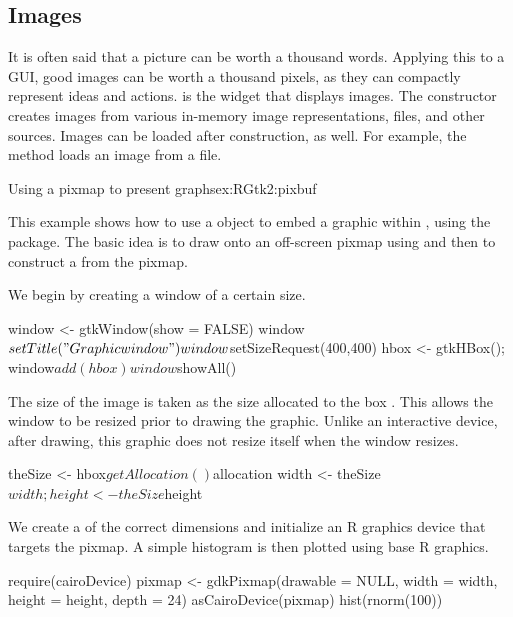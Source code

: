 \subsection{Images}
\label{sec:RGtk2:images}

It is often said that a picture can be worth a thousand
words. Applying this to a GUI, good images can be worth a thousand
pixels, as they can compactly represent ideas and actions.  is the widget that
displays images. The constructor  creates images
from various in-memory image representations, files, and other
sources.  Images can be loaded after construction, as well. For
example, the  method loads an image from
a file.

\begin{example}{Using a pixmap to present graphs}{ex:RGtk2:pixbuf}

  This example shows how to use a  object to
  embed a graphic within , using the
   package. The basic idea is to draw onto an
  off-screen pixmap using  and
  then to construct a  from the pixmap. 

  We begin by creating a window of a certain size.
\begin{Schunk}
\begin{Sinput}
 window <- gtkWindow(show = FALSE)
 window$setTitle("Graphic window")
 window$setSizeRequest(400,400)
 hbox <- gtkHBox(); window$add(hbox)
 window$showAll()
\end{Sinput}
\end{Schunk}


The size of the image is taken as the size allocated to the box
. This allows the window to be resized prior to drawing the
graphic. Unlike an interactive device, after drawing, this graphic
does not resize itself when the window resizes.
\begin{Schunk}
\begin{Sinput}
 theSize <- hbox$getAllocation()$allocation
 width <- theSize$width; height <- theSize$height
\end{Sinput}
\end{Schunk}

We create a  of the correct dimensions and
initialize an R graphics device that targets the pixmap. A simple
histogram is then plotted using base R graphics.
\begin{Schunk}
\begin{Sinput}
 require(cairoDevice)
 pixmap <- gdkPixmap(drawable = NULL, 
                     width = width, height = height, depth = 24)
 asCairoDevice(pixmap)
 hist(rnorm(100))
\end{Sinput}
\end{Schunk}


\end{example}
